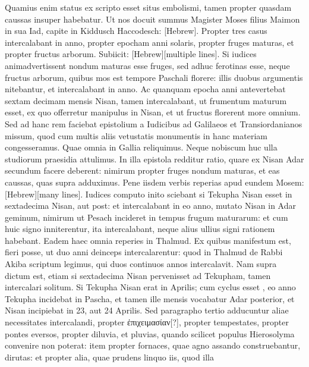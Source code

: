 %
Quamius enim status ex scripto esset situs embolismi,
 tamen propter
quasdam caussas insuper habebatur.
Ut nos docuit summus Magister
Moses filius Maimon in sua Iad, capite in Kiddusch Haccodesch:
\texthebrew{}[Hebrew].
Propter
tres casus intercalabant in anno, propter epocham anni solaris,
propter fruges maturas, et propter fructus arborum.
Subiicit:
\texthebrew{}[Hebrew][multiple lines].
Si iudices animadvertissent nondum
maturas esse fruges, sed adhuc ferotinas esse, neque fructus arborum,
quibus mos est tempore Paschali florere: illis duobus argumentis nitebantur,
et intercalabant in anno.
Ac quanquam epocha anni antevertebat
sextam decimam mensis Nisan, tamen intercalabant, ut
frumentum maturum esset, ex quo offerretur manipulus in 
Nisan, et ut fructus florerent more omnium.
Sed ad hanc rem
faciebat epistolium a Iudicibus ad Galilaeos et Transiordanianos
missum, quod cum multis aliis vetustatis monumentis in hanc materiam
congesseramus.
Quae omnia in Gallia reliquimus.
Neque nobiscum
huc ulla studiorum praesidia attulimus.
In illa epistola redditur
ratio, quare ex Nisan Adar secundum facere deberent: nimirum propter
fruges nondum maturas, et eas caussas, quas supra adduximus.
Pene iisdem verbis reperias apud eundem Mosem:
 \texthebrew{}[Hebrew][many lines].
Iudices computo inito sciebant si Tekupha Nisan esset in sextadecima
Nisan, aut post: et intercalabant in eo anno, mutato Nisan in
Adar geminum, nimirum ut Pesach incideret in tempus frugum maturarum:
et cum huic signo inniterentur, ita intercalabant, neque
alius ullius signi rationem habebant.
Eadem haec omnia reperies in
Thalmud.
Ex quibus manifestum est, fieri posse, ut duo anni deinceps
intercalarentur: quod in Thalmud de Rabbi Akiba scriptum legimus,
qui duos continuos annos intercalavit.
Nam supra dictum est,
etiam si sextadecima Nisan pervenisset ad Tekupham, tamen intercalari
solitum.
Si Tekupha Nisan erat in  Aprilis; cum cyclus esset
, eo anno Tekupha incidebat in Pascha, et tamen ille mensis
vocabatur Adar posterior, et Nisan incipiebat in 23, aut 24 Aprilis.
Sed paragrapho tertio adducuntur aliae necessitates intercalandi,
propter \textgreek{ἐπιχειμασίαν[?]}, propter tempestates, propter pontes eversos,
propter diluvia, et pluvias, quando scilicet populus Hierosolyma
convenire non poterat: item propter fornaces, quae agno assando construebantur,
dirutas: et propter alia, quae prudens linquo iis, quod illa
